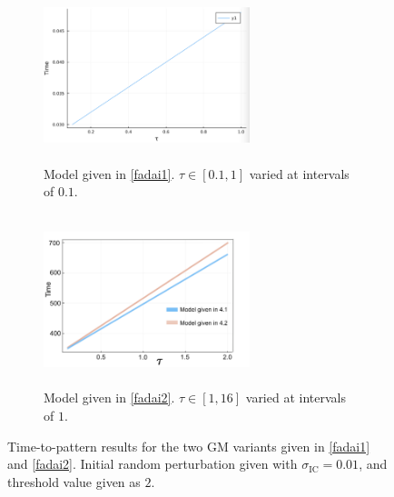 \begin{figure}[H]
    \centering
    \begin{subfigure}[t]{0.45\textwidth}
        \centering
        \includegraphics[width=6cm,height = 5cm]{fad2lin.png}
        \caption{Model given in \eqref{fadai1}. $\tau\in[0.1,1]$ varied at intervals of $0.1$.}
        \label{}
    \end{subfigure}
    \hfill
    \begin{subfigure}[t]{0.45\textwidth}
        \centering
        \includegraphics[width=6cm,height = 5cm]{gmlin1.png}
        \caption{Model given in \eqref{fadai2}. $\tau\in[1,16]$ varied at intervals of $1$.}
        \label{}
    \end{subfigure}
    \caption{Time-to-pattern results for the two GM variants given in \eqref{fadai1} and \eqref{fadai2}. Initial random perturbation given with $\sigma_{\text{IC}}=0.01$, and threshold value given as $2$.}
    \label{fig:fadlin}
\end{figure}
